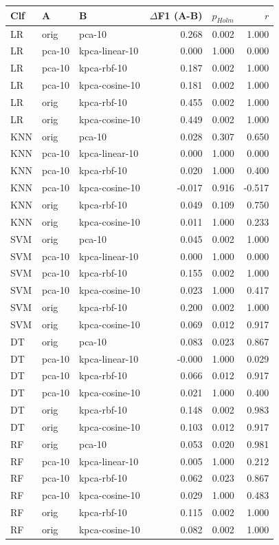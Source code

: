 \begin{tabular}{lllrrr}
\toprule
Clf & A & B & $\Delta$F1 (A-B) & $p_{Holm}$ & $r$ \\
\midrule
LR & orig & pca-10 & 0.268 & 0.002 & 1.000 \\
LR & pca-10 & kpca-linear-10 & 0.000 & 1.000 & 0.000 \\
LR & pca-10 & kpca-rbf-10 & 0.187 & 0.002 & 1.000 \\
LR & pca-10 & kpca-cosine-10 & 0.181 & 0.002 & 1.000 \\
LR & orig & kpca-rbf-10 & 0.455 & 0.002 & 1.000 \\
LR & orig & kpca-cosine-10 & 0.449 & 0.002 & 1.000 \\
KNN & orig & pca-10 & 0.028 & 0.307 & 0.650 \\
KNN & pca-10 & kpca-linear-10 & 0.000 & 1.000 & 0.000 \\
KNN & pca-10 & kpca-rbf-10 & 0.020 & 1.000 & 0.400 \\
KNN & pca-10 & kpca-cosine-10 & -0.017 & 0.916 & -0.517 \\
KNN & orig & kpca-rbf-10 & 0.049 & 0.109 & 0.750 \\
KNN & orig & kpca-cosine-10 & 0.011 & 1.000 & 0.233 \\
SVM & orig & pca-10 & 0.045 & 0.002 & 1.000 \\
SVM & pca-10 & kpca-linear-10 & 0.000 & 1.000 & 0.000 \\
SVM & pca-10 & kpca-rbf-10 & 0.155 & 0.002 & 1.000 \\
SVM & pca-10 & kpca-cosine-10 & 0.023 & 1.000 & 0.417 \\
SVM & orig & kpca-rbf-10 & 0.200 & 0.002 & 1.000 \\
SVM & orig & kpca-cosine-10 & 0.069 & 0.012 & 0.917 \\
DT & orig & pca-10 & 0.083 & 0.023 & 0.867 \\
DT & pca-10 & kpca-linear-10 & -0.000 & 1.000 & 0.029 \\
DT & pca-10 & kpca-rbf-10 & 0.066 & 0.012 & 0.917 \\
DT & pca-10 & kpca-cosine-10 & 0.021 & 1.000 & 0.400 \\
DT & orig & kpca-rbf-10 & 0.148 & 0.002 & 0.983 \\
DT & orig & kpca-cosine-10 & 0.103 & 0.012 & 0.917 \\
RF & orig & pca-10 & 0.053 & 0.020 & 0.981 \\
RF & pca-10 & kpca-linear-10 & 0.005 & 1.000 & 0.212 \\
RF & pca-10 & kpca-rbf-10 & 0.062 & 0.023 & 0.867 \\
RF & pca-10 & kpca-cosine-10 & 0.029 & 1.000 & 0.483 \\
RF & orig & kpca-rbf-10 & 0.115 & 0.002 & 1.000 \\
RF & orig & kpca-cosine-10 & 0.082 & 0.002 & 1.000 \\
\bottomrule
\end{tabular}

